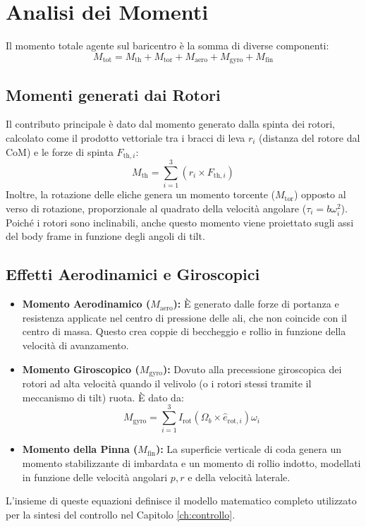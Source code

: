 \section{Analisi dei Momenti}
Il momento totale agente sul baricentro è la somma di diverse componenti:
\begin{equation}
    M_{\mathrm{tot}} = M_{\mathrm{th}} + M_{\mathrm{tor}} + M_{\mathrm{aero}} + M_{\mathrm{gyro}} + M_{\mathrm{fin}}
\end{equation}

\subsection{Momenti generati dai Rotori}
Il contributo principale è dato dal momento generato dalla spinta dei rotori, calcolato come il prodotto vettoriale tra i bracci di leva $r_i$ (distanza del rotore dal CoM) e le forze di spinta $F_{\mathrm{th},i}$:
\begin{equation}
    M_{\mathrm{th}} = \sum_{i=1}^{3} (r_i \times F_{\mathrm{th},i})
\end{equation}
Inoltre, la rotazione delle eliche genera un momento torcente ($M_{\mathrm{tor}}$) opposto al verso di rotazione, proporzionale al quadrato della velocità angolare ($\tau_i = b \omega_i^2$). Poiché i rotori sono inclinabili, anche questo momento viene proiettato sugli assi del body frame in funzione degli angoli di tilt.

\subsection{Effetti Aerodinamici e Giroscopici}
\begin{itemize}
    \item \textbf{Momento Aerodinamico ($M_{\mathrm{aero}}$):} È generato dalle forze di portanza e resistenza applicate nel centro di pressione delle ali, che non coincide con il centro di massa. Questo crea coppie di beccheggio e rollio in funzione della velocità di avanzamento.
    \item \textbf{Momento Giroscopico ($M_{\mathrm{gyro}}$):} Dovuto alla precessione giroscopica dei rotori ad alta velocità quando il velivolo (o i rotori stessi tramite il meccanismo di tilt) ruota. È dato da:
    \begin{equation}
        M_{\mathrm{gyro}} = \sum_{i=1}^{3} I_{\mathrm{rot}} (\Omega_b \times \hat{e}_{\mathrm{rot},i}) \omega_i
    \end{equation}
    \item \textbf{Momento della Pinna ($M_{\mathrm{fin}}$):} La superficie verticale di coda genera un momento stabilizzante di imbardata e un momento di rollio indotto, modellati in funzione delle velocità angolari $p, r$ e della velocità laterale.
\end{itemize}
L'insieme di queste equazioni definisce il modello matematico completo utilizzato per la sintesi del controllo nel Capitolo \ref{ch:controllo}.